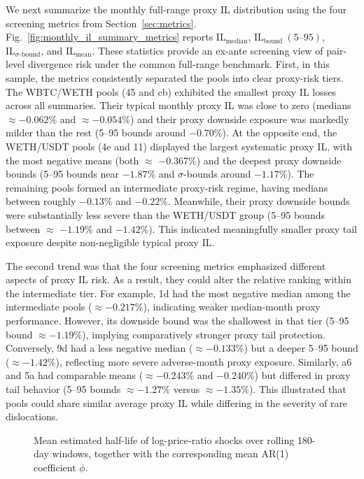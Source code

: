 \documentclass[10pt,conference,compsocconf]{IEEEtran}
\begin{document}
We next summarize the monthly full-range proxy IL distribution using the four screening metrics from Section~\ref{sec:metrics}. Fig.~\ref{fig:monthly_il_summary_metrics} reports $\mathrm{IL}_{\text{median}}$, $\mathrm{IL}_{\text{bound}}~(5\text{--}95)$, $\mathrm{IL}_{\sigma\text{-bound}}$, and $\mathrm{IL}_{\text{mean}}$. These statistics provide an ex-ante screening view of pair-level divergence risk under the common full-range benchmark.
First, in this sample, the metrics consistently separated the pools into clear proxy-risk tiers. The WBTC/WETH pools (45 and cb) exhibited the smallest proxy IL losses across all summaries. Their typical monthly proxy IL was close to zero (medians $\approx-0.062\%$ and $\approx-0.054\%$) and their proxy downside exposure was markedly milder than the rest (5--95 bounds around $-0.70\%$). At the opposite end, the WETH/USDT pools (4e and 11) displayed the largest systematic proxy IL, with the most negative means (both $\approx$ $-0.367\%$) and the deepest proxy downside bounds (5--95 bounds near $-1.87\%$ and $\sigma$-bounds around $-1.17\%$). 
The remaining pools formed an intermediate proxy-risk regime, having medians between roughly $-0.13\%$ and $-0.22\%$. Meanwhile, their proxy downside bounds were substantially less severe than the WETH/USDT group (5--95 bounds between $\approx$ $-1.19\%$ and $-1.42\%$). This indicated meaningfully smaller proxy tail exposure despite non-negligible typical proxy IL.

The second trend was that the four screening metrics emphasized different aspects of proxy IL risk. 
As a result, they could alter the relative ranking within the intermediate tier. 
For example, 1d had the most negative median among the intermediate pools ($\approx-0.217\%$), indicating weaker median-month proxy performance. 
However, its downside bound was the shallowest in that tier (5--95 bound $\approx-1.19\%$), implying comparatively stronger proxy tail protection. 
Conversely, 9d had a less negative median ($\approx-0.133\%$) but a deeper 5--95 bound ($\approx-1.42\%$), reflecting more severe adverse-month proxy exposure. 
Similarly, a6 and 5a had comparable means ($\approx-0.243\%$ and $-0.240\%$) but differed in proxy tail behavior (5--95 bounds $\approx-1.27\%$ versus $\approx-1.35\%$). 
This illustrated that pools could share similar average proxy IL while differing in the severity of rare dislocations.


\begin{figure}[t]
\centering
\resizebox{0.4\textwidth}{!}{%
        
    }
\caption{Mean estimated half-life of log-price-ratio shocks over rolling 180-day windows, together with the corresponding mean AR(1) coefficient $\phi$.}
\label{fig:half_life_180d_mean_phi_inside}
\end{figure}
\end{document}
